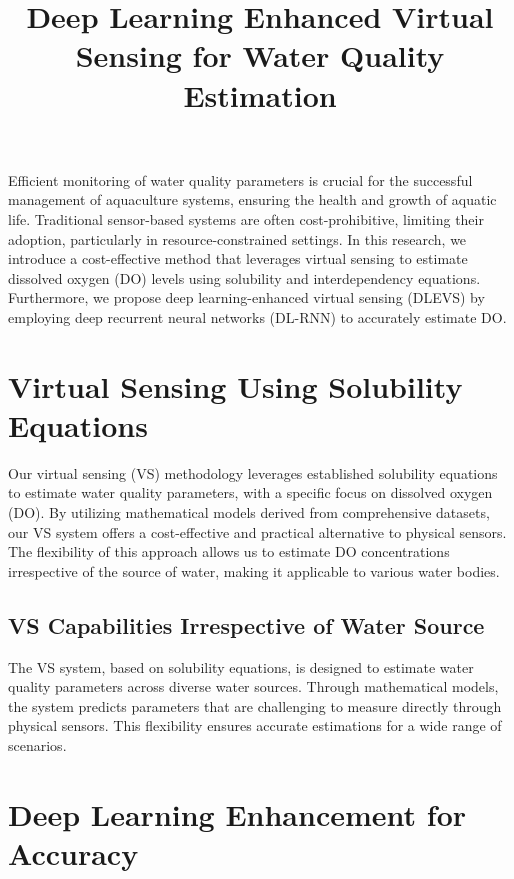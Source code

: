 \documentclass[a4paper, 11pt]{article}
\begin{document}
	
	\title{Deep Learning Enhanced Virtual Sensing for Water Quality Estimation}
	\maketitle
	
	Efficient monitoring of water quality parameters is crucial for the successful management of aquaculture systems, ensuring the health and growth of aquatic life. Traditional sensor-based systems are often cost-prohibitive, limiting their adoption, particularly in resource-constrained settings. In this research, we introduce a cost-effective method that leverages virtual sensing to estimate dissolved oxygen (DO) levels using solubility and interdependency equations. Furthermore, we propose deep learning-enhanced virtual sensing (DLEVS) by employing deep recurrent neural networks (DL-RNN) to accurately estimate DO. 
	
	\section*{Virtual Sensing Using Solubility Equations}
	
	Our virtual sensing (VS) methodology leverages established solubility equations to estimate water quality parameters, with a specific focus on dissolved oxygen (DO). By utilizing mathematical models derived from comprehensive datasets, our VS system offers a cost-effective and practical alternative to physical sensors. The flexibility of this approach allows us to estimate DO concentrations irrespective of the source of water, making it applicable to various water bodies.
	
	\subsection*{VS Capabilities Irrespective of Water Source}
	
	The VS system, based on solubility equations, is designed to estimate water quality parameters across diverse water sources. Through mathematical models, the system predicts parameters that are challenging to measure directly through physical sensors. This flexibility ensures accurate estimations for a wide range of scenarios.
	
	\section*{Deep Learning Enhancement for Accuracy}
	
\end{document}
